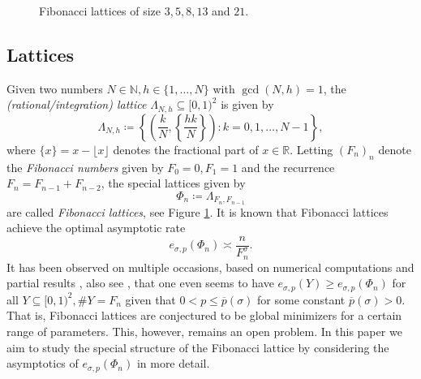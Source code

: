 \documentclass[]{interact}
\newcommand{\bbN}{\mathbb{N}}
\newcommand{\bbR}{\mathbb{R}}
\newcommand{\sbse}{\subseteq}
\theoremstyle{definition}
\numberwithin{table}{section} %
\numberwithin{figure}{section}
\begin{document}
\begin{figure}[t]
                        \caption{Fibonacci lattices of size $3, 5, 8, 13$ and $21$.}
\label{fig:fib_lats}
\end{figure}

\subsection{Lattices}

Given two numbers $N \in \bbN, h \in \{1, \dots, N\}$ with $\gcd(N, h) = 1$, the \emph{(rational/integration) lattice} $\Lambda_{N, h} \sbse [0, 1)^2$ is given by
$$
\Lambda_{N, h} \coloneqq \left\{\left(\frac kN, \left\{ \frac{hk}N\right\}\right): k=0, 1, \dots, N-1\right\},
$$
where $\{x\} = x-\lfloor x \rfloor$ denotes the fractional part of $x \in \bbR$. Letting $(F_n)_n$ denote the \emph{Fibonacci numbers} given by $F_0=0, F_1=1$ and the recurrence $F_n = F_{n-1} + F_{n-2}$, the special lattices given by
$$
\Phi_n \coloneqq \Lambda_{F_n, F_{n-1}}
$$
are called \emph{Fibonacci lattices}, see Figure \ref{fig:fib_lats}. It is known that Fibonacci lattices achieve the optimal asymptotic rate \cite{DTU18}
$$
e_{\sigma, p}(\Phi_n) \asymp \frac{n}{F_n^\sigma}.
$$
It has been observed on multiple occasions, based on numerical computations \cite{HO16} and partial results \cite{BNR25, Nag26}, also see \cite{NagDiss}, that one even seems to have $e_{\sigma, p}(Y) \geq e_{\sigma, p}(\Phi_n)$ for all $Y \subseteq [0, 1)^2, \# Y = F_n$ given that $0 < p \leq \overline p(\sigma)$ for some constant $\overline p(\sigma) > 0$. That is, Fibonacci lattices are conjectured to be global minimizers for a certain range of parameters. This, however, remains an open problem. In this paper we aim to study the special structure of the Fibonacci lattice by considering the asymptotics of $e_{\sigma, p}(\Phi_n)$ in more detail.
\end{document}
